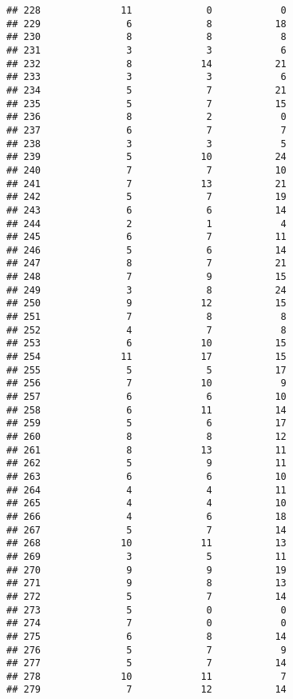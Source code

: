 \documentclass[
]{article}
\begin{document}
\begin{verbatim}
## 228              11             0            0
## 229               6             8           18
## 230               8             8            8
## 231               3             3            6
## 232               8            14           21
## 233               3             3            6
## 234               5             7           21
## 235               5             7           15
## 236               8             2            0
## 237               6             7            7
## 238               3             3            5
## 239               5            10           24
## 240               7             7           10
## 241               7            13           21
## 242               5             7           19
## 243               6             6           14
## 244               2             1            4
## 245               6             7           11
## 246               5             6           14
## 247               8             7           21
## 248               7             9           15
## 249               3             8           24
## 250               9            12           15
## 251               7             8            8
## 252               4             7            8
## 253               6            10           15
## 254              11            17           15
## 255               5             5           17
## 256               7            10            9
## 257               6             6           10
## 258               6            11           14
## 259               5             6           17
## 260               8             8           12
## 261               8            13           11
## 262               5             9           11
## 263               6             6           10
## 264               4             4           11
## 265               4             4           10
## 266               4             6           18
## 267               5             7           14
## 268              10            11           13
## 269               3             5           11
## 270               9             9           19
## 271               9             8           13
## 272               5             7           14
## 273               5             0            0
## 274               7             0            0
## 275               6             8           14
## 276               5             7            9
## 277               5             7           14
## 278              10            11            7
## 279               7            12           14

\end{verbatim}
\end{document}
